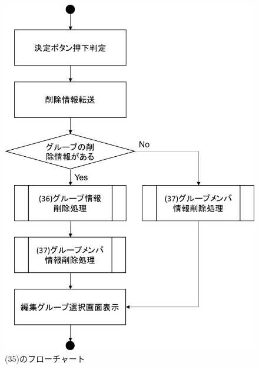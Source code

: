 \begin{figure}[htbp]
 \begin{center}
  \includegraphics[width=0.5\linewidth,clip]{./img/flow/35.png}
 \end{center}
\caption{(35)のフローチャート}\label{fig:35}
\end{figure}


